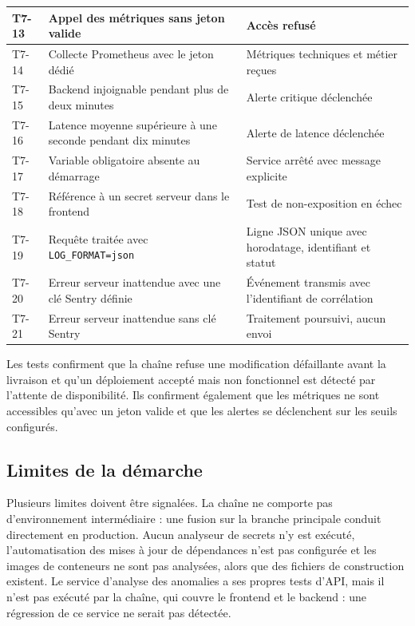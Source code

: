 {\begin{longtable}{|p{0.9cm}|>{\raggedright\arraybackslash}p{7cm}|>{\raggedright\arraybackslash}p{4.7cm}|}
T7-13 &
Appel des métriques sans jeton valide &
Accès refusé \\
\hline

T7-14 &
Collecte Prometheus avec le jeton dédié &
Métriques techniques et métier reçues \\
\hline

T7-15 &
Backend injoignable pendant plus de deux minutes &
Alerte critique déclenchée \\
\hline

T7-16 &
Latence moyenne supérieure à une seconde pendant dix minutes &
Alerte de latence déclenchée \\
\hline

T7-17 &
Variable obligatoire absente au démarrage &
Service arrêté avec message explicite \\
\hline

T7-18 &
Référence à un secret serveur dans le frontend &
Test de non-exposition en échec \\
\hline

T7-19 &
Requête traitée avec \texttt{LOG\_FORMAT=json} &
Ligne JSON unique avec horodatage, identifiant et statut \\
\hline

T7-20 &
Erreur serveur inattendue avec une clé Sentry définie &
Événement transmis avec l'identifiant de corrélation \\
\hline

T7-21 &
Erreur serveur inattendue sans clé Sentry &
Traitement poursuivi, aucun envoi \\
\hline

\end{longtable}}

Les tests confirment que la chaîne refuse une modification défaillante avant la livraison et qu'un déploiement accepté mais non fonctionnel est détecté par l'attente de disponibilité. Ils confirment également que les métriques ne sont accessibles qu'avec un jeton valide et que les alertes se déclenchent sur les seuils configurés.

\subsection{Limites de la démarche}

Plusieurs limites doivent être signalées. La chaîne ne comporte pas d'environnement intermédiaire : une fusion sur la branche principale conduit directement en production. Aucun analyseur de secrets n'y est exécuté, l'automatisation des mises à jour de dépendances n'est pas configurée et les images de conteneurs ne sont pas analysées, alors que des fichiers de construction existent. Le service d'analyse des anomalies a ses propres tests d'API, mais il n'est pas exécuté par la chaîne, qui couvre le frontend et le backend : une régression de ce service ne serait pas détectée.


